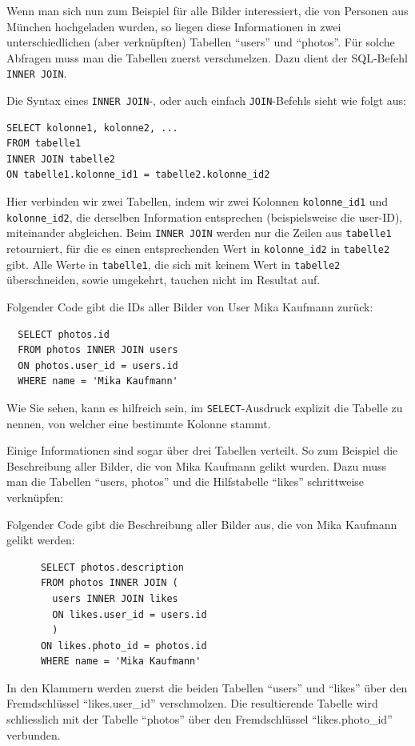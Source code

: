Wenn man sich nun zum Beispiel für alle Bilder interessiert, die von Personen aus München hochgeladen wurden, so liegen diese Informationen in zwei unterschiedlichen (aber verknüpften) Tabellen \enquote{users} und \enquote{photos}. Für solche Abfragen muss man die Tabellen zuerst verschmelzen. Dazu dient der SQL-Befehl \lstinline|INNER JOIN|.

Die Syntax eines \lstinline|INNER JOIN|-, oder auch einfach \lstinline|JOIN|-Befehls sieht wie folgt aus:

\begin{lstlisting}
SELECT kolonne1, kolonne2, ...
FROM tabelle1
INNER JOIN tabelle2
ON tabelle1.kolonne_id1 = tabelle2.kolonne_id2
\end{lstlisting}
Hier verbinden wir zwei Tabellen, indem wir zwei Kolonnen \texttt{kolonne\_id1} und \texttt{kolonne\_id2}, die derselben Information entsprechen (beispielsweise die user-ID), miteinander abgleichen. Beim \lstinline|INNER JOIN| werden nur die Zeilen aus \texttt{tabelle1} retourniert, für die es einen entsprechenden Wert in \texttt{kolonne\_id2} in \texttt{tabelle2} gibt. Alle Werte in \texttt{tabelle1}, die sich mit keinem Wert in \texttt{tabelle2} überschneiden, sowie umgekehrt, tauchen nicht im Resultat auf.

\begin{myexample}
  Folgender Code gibt die IDs aller Bilder von User Mika Kaufmann zurück:
  \begin{lstlisting}
  SELECT photos.id
  FROM photos INNER JOIN users
  ON photos.user_id = users.id
  WHERE name = 'Mika Kaufmann'
  \end{lstlisting}

  Wie Sie sehen, kann es hilfreich sein, im \lstinline|SELECT|-Ausdruck explizit die Tabelle zu nennen, von welcher eine bestimmte Kolonne stammt.
  \end{myexample}

  Einige Informationen sind sogar über drei Tabellen verteilt. So zum Beispiel die Beschreibung aller Bilder, die von Mika Kaufmann gelikt wurden. Dazu muss man die Tabellen \enquote{users, photos} und die Hilfstabelle \enquote{likes} schrittweise verknüpfen:

  \begin{myexample}
    Folgender Code gibt die Beschreibung aller Bilder aus, die von Mika Kaufmann gelikt werden:
    \begin{lstlisting}
      SELECT photos.description
      FROM photos INNER JOIN (
        users INNER JOIN likes
        ON likes.user_id = users.id
        )
      ON likes.photo_id = photos.id
      WHERE name = 'Mika Kaufmann'
    \end{lstlisting}

    In den Klammern werden zuerst die beiden Tabellen \enquote{users} und \enquote{likes} über den Fremdschlüssel \enquote{likes.user\_id} verschmolzen. Die resultierende Tabelle wird schliesslich mit der Tabelle \enquote{photos} über den Fremdschlüssel \enquote{likes.photo\_id} verbunden.
    \end{myexample}

